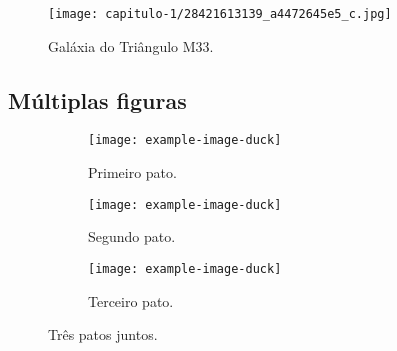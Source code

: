 \begin{figure}[h!]
    \centering
    \texttt{[image: capitulo-1/28421613139\_a4472645e5\_c.jpg]}
    \caption[Galáxia M33]{Galáxia do Triângulo M33.}
\end{figure}

\subsection{Múltiplas figuras}

\begin{figure}[t]
    \centering
    \begin{subfigure}[b]{0.3\textwidth}
        \centering
        \texttt{[image: example-image-duck]}
        \caption{Primeiro pato.}
    \end{subfigure}
    \hfill
    \begin{subfigure}[b]{0.3\textwidth}
        \centering
        \texttt{[image: example-image-duck]}
        \caption{Segundo pato.}
    \end{subfigure}
    \hfill
    \begin{subfigure}[b]{0.3\textwidth}
        \centering
        \texttt{[image: example-image-duck]}
        \caption{Terceiro pato.}
    \end{subfigure}
       \caption{Três patos juntos.}
\end{figure}
